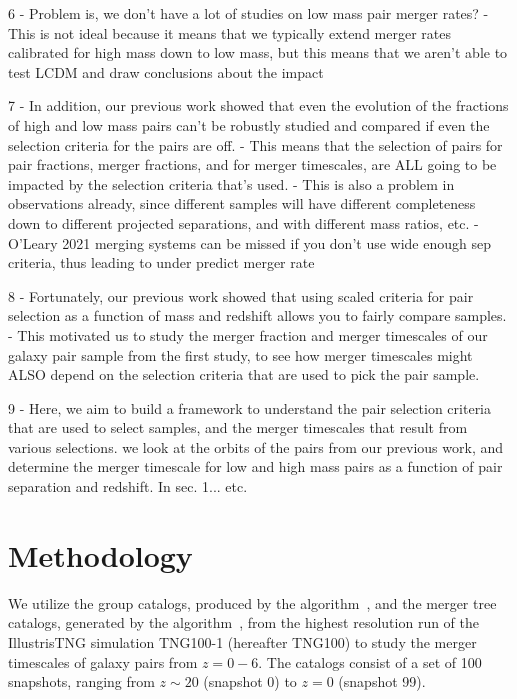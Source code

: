 \documentclass[twocolumn,linenumbers]{aastex631}
\begin{document}
6 - Problem is, we don't have a lot of studies on low mass pair merger rates? 
    - This is not ideal because it means that we typically extend merger rates calibrated for high mass down to low mass, but this means that we aren't able to test LCDM and draw conclusions about the impact

7 - In addition, our previous work showed that even the evolution of the fractions of high and low mass pairs can't be robustly studied and compared if even the selection criteria for the pairs are off. 
    - This means that the selection of pairs for pair fractions, merger fractions, and for merger timescales, are ALL going to be impacted by the selection criteria that's used. 
    - This is also a problem in observations already, since different samples will have different completeness down to different projected separations, and with different mass ratios, etc. 
    - O'Leary 2021 merging systems can be missed if you don't use wide enough sep criteria, thus leading to under predict merger rate

8 - Fortunately, our previous work showed that using scaled criteria for pair selection as a function of mass and redshift allows you to fairly compare samples. 
    - This motivated us to study the merger fraction and merger timescales of our galaxy pair sample from the first study, to see how merger timescales might ALSO depend on the selection criteria that are used to pick the pair sample. 


9 - Here, we aim to build a framework to understand the pair selection criteria that are used to select samples, and the merger timescales that result from various selections.  we look at the orbits of the pairs from our previous work, and determine the merger timescale for low and high mass pairs as a function of pair separation and redshift. In sec. 1... etc. 

\section{Methodology} \label{sec:methods}
We utilize the group catalogs, produced by the \subfind{} algorithm~\citep{Springel2001b,Dolag2009}, and the merger tree catalogs, generated by the \sublink{} algorithm~\citep{RG2015}, from the highest resolution run of the IllustrisTNG simulation TNG100-1 (hereafter TNG100) to study the merger timescales of galaxy pairs from $z=0-6$.
The catalogs consist of a set of 100 snapshots, ranging from $z\sim20$ (snapshot 0) to $z=0$ (snapshot 99).
\end{document}
